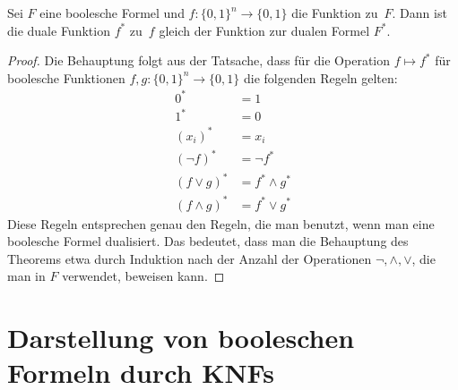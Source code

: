 \begin{thm}
	Sei $F$ eine boolesche Formel und $f : \{0,1\}^n \to \{0,1\}$ die Funktion zu~$F$. Dann ist die duale Funktion $f^\ast$ zu~$f$ gleich der Funktion zur dualen Formel $F^\ast$. 
\end{thm}
\begin{proof} 
	Die Behauptung folgt aus der Tatsache, dass für die Operation $f \mapsto f^\ast$ für boolesche Funktionen $f,g : \{0,1\}^n \to \{0,1\}$ die folgenden Regeln gelten: 
	\begin{align*}
		0^\ast & = 1
		\\ 1^\ast & = 0
		\\ (x_i)^\ast & = x_i
		\\ (\neg{f})^\ast & = \neg{f^\ast}
		\\ (f \vee g)^\ast & = f ^\ast\wedge g^\ast
		\\ (f \wedge g)^\ast & = f ^\ast\vee g^\ast
	\end{align*} 
	Diese Regeln entsprechen genau den Regeln, die man benutzt, wenn man eine boolesche Formel dualisiert. Das bedeutet, dass man die Behauptung des Theorems etwa durch Induktion nach der Anzahl der Operationen $\neg, \wedge, \vee$, die man in $F$ verwendet, beweisen kann. 
\end{proof} 



\section{Darstellung  von booleschen Formeln durch KNFs}

